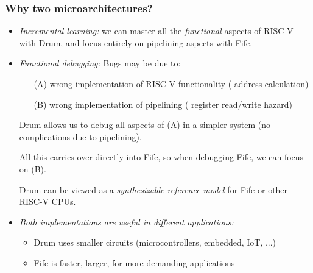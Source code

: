 \begin{frame}
\frametitle{Why two microarchitectures?}

\begin{itemize}

\item \emph{Incremental learning:} we can master all the
  \emph{functional} aspects of RISC-V with Drum, and focus entirely on
  pipelining aspects with Fife.

\pause

\item \emph{Functional debugging:} Bugs may be due to:
  \begin{itemize}
    \item[(A)] wrong implementation of RISC-V functionality ({\eg} address calculation)
    \item[(B)] wrong implementation of pipelining ({\eg} register read/write hazard)
  \end{itemize}

  \vspace{1ex}
  Drum allows us to debug all aspects of (A) in a simpler system (no
  complications due to pipelining).

  \vspace{1ex}
  All this carries over directly into Fife, so when debugging Fife, we can focus on (B).

  \vspace{1ex}
  Drum can be viewed as a \emph{synthesizable reference model} for Fife or other RISC-V CPUs.

\pause

 \item \emph{Both implementations are useful in different applications:}

   \begin{itemize}
   \item Drum uses smaller circuits (microcontrollers, embedded, IoT, ...)
   \item Fife is faster, larger, for more demanding applications
   \end{itemize}
\end{itemize}
\end{frame}


